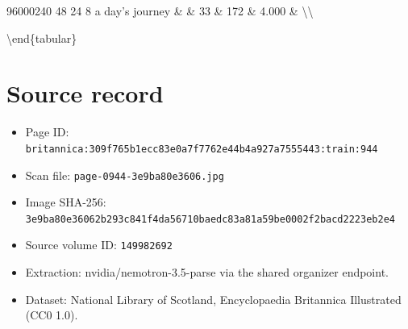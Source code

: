 \documentclass{article}
\begin{document}
96000240 48 24 8 a day's journey \& \& 33 \& 172 \& 4.000 \& \textbackslash{}\textbackslash{}

\textbackslash{}end\{tabular\}

\section*{Source record}
\begin{itemize}
\item Page ID: \texttt{britannica:309f765b1ecc83e0a7f7762e44b4a927a7555443:train:944}
\item Scan file: \texttt{page-0944-3e9ba80e3606.jpg}
\item Image SHA-256: \texttt{3e9ba80e36062b293c841f4da56710baedc83a81a59be0002f2bacd2223eb2e4}
\item Source volume ID: \texttt{149982692}
\item Extraction: nvidia/nemotron-3.5-parse via the shared organizer endpoint.
\item Dataset: National Library of Scotland, Encyclopaedia Britannica Illustrated (CC0 1.0).
\end{itemize}
\end{document}
